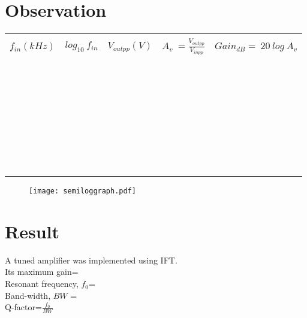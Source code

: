 \section*{Observation}
\begin{center}

\begin{tabular}{|l|l|l|l|l|}

\hline
  & & & &\\
 
$f_{in} (kHz) $  & $log_{10}\ f_{in}$  &  $V_{outpp}(V)$ & $A_v\ =\frac{V_{outpp}}{V_{inpp}} $ & $Gain_{dB}=\ 20\ log\ A_v$ \\ \hline
 & & & &\\ \hline
& & & &\\ \hline
& & & &\\ \hline
& & & &\\ \hline
& & & &\\ \hline
& & & &\\ \hline
& & & &\\ \hline
& & & &\\ \hline
& & & &\\ \hline
& & & &\\ \hline
& & & &\\ \hline
& & & &\\ \hline
& & & &\\ \hline
& & & &\\ \hline
& & & &\\ \hline
& & & &\\ \hline
& & & &\\ \hline
& & & &\\ \hline
& & & &\\ \hline
& & & &\\ \hline
& & & &\\ \hline
& & & &\\ \hline
& & & &\\ \hline
& & & &\\ \hline
& & & &\\ \hline
& & & &\\ \hline
& & & &\\ \hline
& & & &\\ \hline
& & & &\\ \hline
& & & &\\ \hline
& & & &\\ \hline
& & & &\\ \hline
& & & &\\ \hline

\end{tabular}
\end{center}


\begin{figure}
\texttt{[image: semiloggraph.pdf]}
\end{figure}
	





\section*{Result}
A tuned amplifier was implemented using IFT.\\
Its maximum gain= \\
Resonant frequency, $f_0$= \\
Band-width, $BW$ =\\
Q-factor=$\frac{f_0}{BW}$


